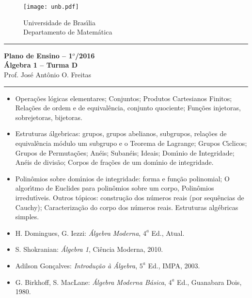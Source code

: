 \documentclass[12pt]{article}
\begin{document}
\pagestyle{empty}

\begin{figure}[h]
    \begin{minipage}[c]{1.7cm}
    \texttt{[image: unb.pdf]}
    \end{minipage}%
    \hspace{0pt}
    \begin{minipage}[c]{4in}
    {Universidade de Bras{\'\i}lia} \\
    {Departamento de Matem{\'a}tica}
    \end{minipage}
\end{figure}
\vspace{-0.9cm}
\hrule

\begin{center}
{\large\bf Plano de Ensino -- 1$^{o}$/2016} \\
{\large\bf \'Algebra 1 -- Turma D}\\
Prof. Jos{\'e} Ant{\^o}nio O. Freitas
\end{center}
\hrule
\vspace{0.25cm}
\begin{itemize}

\item Opera\c{c}\~oes l\'ogicas elementares; Conjuntos; Produtos Cartesianos Finitos; Rela\c{c}\~oes de ordem e de equival\^encia, conjunto quociente; Fun\c{c}\~oes injetoras, sobrejetoras, bijetoras.

\item Estruturas \'algebricas: grupos, grupos abelianos, subgrupos, rela\c{c}\~oes de equival\^encia m\'odulo um subgrupo e o Teorema de Lagrange; Grupos C{\'\i}clicos; Grupos de Permuta\c{c}\~oes; An\'eis; Suban\'eis; Ideais; Dom{\'\i}nio de Integridade; An\'eis de divis\~ao; Corpos de fra\c{c}\~oes de um dom{\'\i}nio de integridade.

\item Polin\^omios sobre dom{\'\i}nios de integridade: forma e fun\c{c}\~ao polinomial; O algor{\'\i}tmo de Euclides para polin\^omios sobre um corpo, Polin\^omios irredut{\'\i}veis. Outros t\'opicos: constru\c{c}\~ao dos n\'umeros reais (por sequ\^encias de Cauchy); Caracteriza\c{c}\~ao do corpo dos n\'umeros reais. Estruturas alg\'ebricas simples.
\end{itemize}

\vspace{0.5cm}
\begin{itemize}

\item H. Domingues, G. Iezzi: {\it {\'A}lgebra Moderna}, $4^a$
  Ed., Atual.

\item S. Shokranian: {\it {\'A}lgebra 1}, Ci{\^e}ncia Moderna, 2010.

\item Adilson Gon{\c c}alves: {\it Introdu{\c c}{\~a}o {\`a} {\'A}lgebra}, $5^a$ Ed., IMPA,
  2003.

\item G. Birkhoff, S. MacLane: {\it {\'A}lgebra Moderna B{\'a}sica}, $4^a$ Ed.,
  Guanabara Dois, 1980.

\end{itemize}
\end{document}
